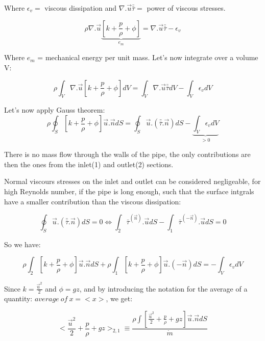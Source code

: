 Where $\epsilon_v=$ viscous dissipation and $\nabla. \vec{u} \bar{\bar{\tau}}=$ power of viscous stresses.

\begin{equation}
\rho \nabla. \vec{u}  \underbrace{[k+\frac{p}{\rho}+\phi]}_{e_m}=\nabla. \vec{u} \bar{\bar{\tau}}-\epsilon_v
\end{equation}

Where $e_m$ = mechanical energy per unit mass. Let's now integrate over a volume V:

\begin{equation}
\rho \int_V\nabla. \vec{u}  [k+\frac{p}{\rho}+\phi]dV=\int_V \nabla. \vec{u} \bar{\bar{\tau}}dV-\int_V\epsilon_v dV
\end{equation}

Let's now apply Gauss theorem:
\begin{equation}
\rho \oint_S[k+\frac{p}{\rho}+\phi]  \vec{u}.\vec{n}  dS=\oint_S  \vec{u}. (\bar{\bar{\tau}}.\vec{n}) dS- \underbrace{\int_V\epsilon_v dV}_{>0}
\end{equation}

There is no mass flow through the walls of the pipe, the only contributions are then the ones from the inlet(1) and outlet(2) sections.

Normal viscours stresses on the inlet and outlet can be considered negligeable, for high Reynolds number, if the pipe is long enough, such that the surface intgrals have a smaller contribution than the viscous dissipation:

\begin{equation}
\oint_S  \vec{u}. (\bar{\bar{\tau}}.\vec{n}) dS=0 \Leftrightarrow  
\int_2  \bar{\tau}^{(\vec{n})}.\vec{u} dS-\int_1  \bar{\tau}^{(-\vec{n})}.\vec{u} dS=0
\end{equation}

So we have:

\begin{equation}
\rho \int_2[k+\frac{p}{\rho}+\phi]  \vec{u}.\vec{n}  dS
+\rho \int_1[k+\frac{p}{\rho}+\phi]  \vec{u}.(-\vec{n})  dS
=- \int_V\epsilon_v dV
\end{equation}

Since $k=\frac{\vec{u}^2}{2}$ and $\phi=gz$, and by introducing the notation for the average of a quantity:  $average \ of \  x=<x>$, we get:

\begin{equation}
<\frac{\vec{u}^2}{2}+\frac{p}{\rho}+gz>_{2,1} \equiv \frac{\rho \int[\frac{\vec{u}^2}{2}+\frac{p}{\rho}+gz]  \vec{u}.\vec{n}  dS}{\dot{m}}
\end{equation}

